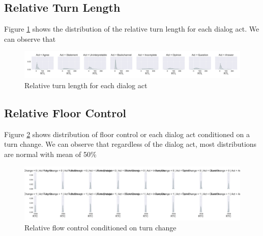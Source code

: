 \subsection{Relative Turn Length}

Figure \ref{l5} shows the distribution of the relative turn length for each dialog act. We can observe
that

\begin{figure}[ht!]
\centering
\includegraphics[width=\textwidth]{../scikitlearn/figures/grid_precent_secs_sofar_by_da_name.pdf}
\caption{Relative turn length for each dialog act\label{overflow}}
\label{l5}
\end{figure}


\subsection{Relative Floor Control}

Figure \ref{l6} shows distribution of floor control or each dialog act conditioned on a turn change. We can observe that regardless of the dialog act, most distributions are normal with mean of 50\%

\begin{figure}[ht!]
\centering
\includegraphics[width=\textwidth]{../scikitlearn/figures/grid_timecontrol_by_da_name_by_tchange.pdf}
\caption{Relative flow control conditioned on turn change\label{overflow}}
\label{l6}
\end{figure}


